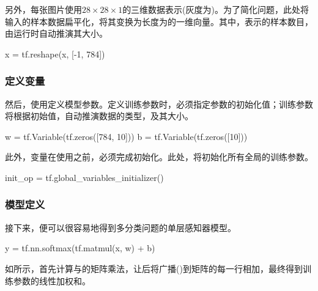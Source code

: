 \begin{content}
\begin{content}
另外，每张图片使用$ 28 \times 28 \times 1 $的三维数据表示(灰度为)。为了简化问题，此处将输入的样本数据扁平化，将其变换为长度为的一维向量。其中，表示的样本数目，由运行时自动推演其大小。

\begin{leftbar}
\begin{python}
x = tf.reshape(x, [-1, 784])
\end{python}
\end{leftbar}

\subsubsection{定义变量}

然后，使用定义模型参数。定义训练参数时，必须指定参数的初始化值；训练参数将根据初始值，自动推演数据的类型，及其大小。

\begin{leftbar}
\begin{python}
w = tf.Variable(tf.zeros([784, 10]))
b = tf.Variable(tf.zeros([10]))
\end{python}
\end{leftbar}

此外，变量在使用之前，必须完成初始化。此处，将初始化所有全局的训练参数。

\begin{leftbar}
\begin{python}
init_op = tf.global_variables_initializer()
\end{python}
\end{leftbar}

\subsubsection{模型定义}

接下来，便可以很容易地得到多分类问题的单层感知器模型。

\begin{leftbar}
\begin{python}
y = tf.nn.softmax(tf.matmul(x, w) + b)
\end{python}
\end{leftbar}

如所示，首先计算与的矩阵乘法，让后将广播()到矩阵的每一行相加，最终得到训练参数的线性加权和。


\end{content}
\end{content}
